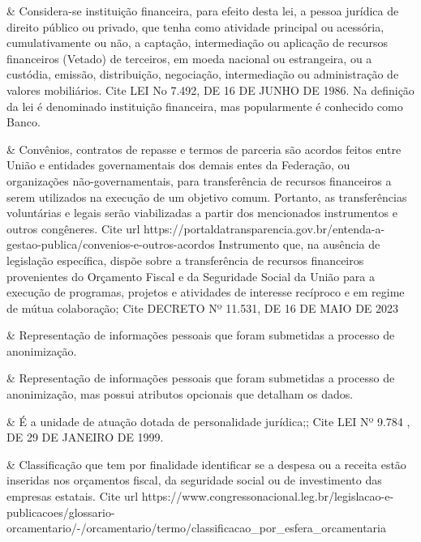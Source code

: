  &
Considera-se instituição financeira, para efeito desta lei, a pessoa jurídica de direito público ou privado, que tenha como atividade principal ou acessória, cumulativamente ou não, a captação, intermediação ou aplicação de recursos financeiros (Vetado) de terceiros, em moeda nacional ou estrangeira, ou a custódia, emissão, distribuição, negociação, intermediação ou administração de valores mobiliários. Cite LEI No 7.492, DE 16 DE JUNHO DE 1986. Na definição da lei é denominado instituição financeira, mas popularmente é conhecido como Banco. 
\\ \hline

 &
Convênios, contratos de repasse e termos de parceria são acordos feitos entre União e entidades governamentais dos demais entes da Federação, ou organizações não-governamentais, para transferência de recursos financeiros a serem utilizados na execução de um objetivo comum. Portanto, as transferências voluntárias e legais serão viabilizadas a partir dos mencionados instrumentos e outros congêneres. Cite url https://portaldatransparencia.gov.br/entenda-a-gestao-publica/convenios-e-outros-acordos Instrumento que, na ausência de legislação específica, dispõe sobre a transferência de recursos financeiros provenientes do Orçamento Fiscal e da Seguridade Social da União para a execução de programas, projetos e atividades de interesse recíproco e em regime de mútua colaboração; Cite DECRETO Nº 11.531, DE 16 DE MAIO DE 2023 
\\ \hline

 &
Representação de informações pessoais que foram submetidas a processo de anonimização. 
\\ \hline

 &
Representação de informações pessoais que foram submetidas a processo de anonimização, mas possui atributos opcionais que detalham os dados. 
\\ \hline

 &
É a unidade de atuação dotada de personalidade jurídica;; Cite LEI Nº 9.784 , DE 29 DE JANEIRO DE 1999. 
\\ \hline

 &
Classificação que tem por finalidade identificar se a despesa ou a receita estão inseridas nos orçamentos fiscal, da seguridade social ou de investimento das empresas estatais. Cite url https://www.congressonacional.leg.br/legislacao-e-publicacoes/glossario-orcamentario/-/orcamentario/termo/classificacao\_por\_esfera\_orcamentaria 
\\ \hline

